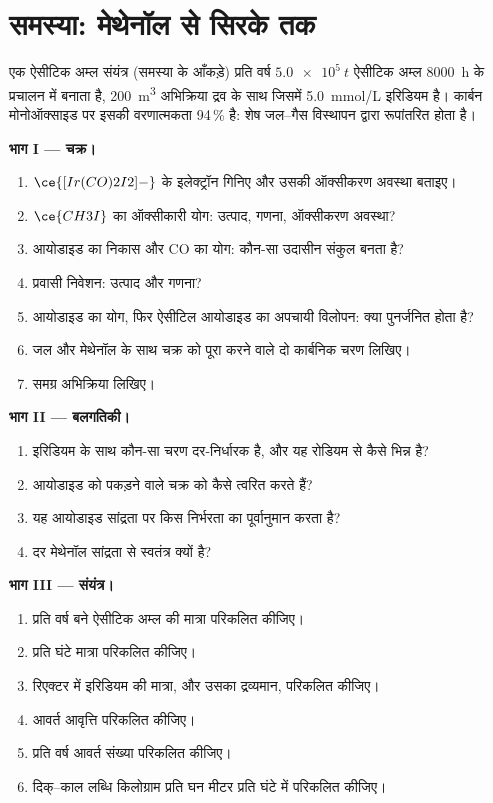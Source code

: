 \section{समस्या: मेथेनॉल से सिरके तक}

\begin{problem}
\label{pb:b3:homogeneous-catalysis:1}
एक ऐसीटिक अम्ल संयंत्र (समस्या के आँकड़े) प्रति वर्ष $\qty{5.0e5}{t}$ ऐसीटिक अम्ल
\qty{8000}{h} के प्रचालन में बनाता है, \qty{200}{m^3} अभिक्रिया द्रव के साथ जिसमें \qty{5.0}{mmol/L}
इरिडियम है। कार्बन मोनोऑक्साइड पर इसकी वरणात्मकता 94\,\% है: शेष
जल--गैस विस्थापन द्वारा रूपांतरित होता है।

\medskip\noindent\textbf{भाग I --- चक्र।}
\begin{enumerate}
  \item $\ce{[Ir(CO)2I2]-}$ के इलेक्ट्रॉन गिनिए और उसकी ऑक्सीकरण अवस्था बताइए।
  \item $\ce{CH3I}$ का ऑक्सीकारी योग: उत्पाद, गणना, ऑक्सीकरण अवस्था?
  \item आयोडाइड का निकास और CO का योग: कौन-सा उदासीन संकुल बनता है?
  \item प्रवासी निवेशन: उत्पाद और गणना?
  \item आयोडाइड का योग, फिर ऐसीटिल आयोडाइड का अपचायी विलोपन: क्या
        पुनर्जनित होता है?
  \item जल और मेथेनॉल के साथ चक्र को पूरा करने वाले दो कार्बनिक चरण लिखिए।
  \item समग्र अभिक्रिया लिखिए।
\end{enumerate}

\medskip\noindent\textbf{भाग II --- बलगतिकी।}
\begin{enumerate}[resume]
  \item इरिडियम के साथ कौन-सा चरण दर-निर्धारक है, और यह रोडियम से
        कैसे भिन्न है?
  \item आयोडाइड को पकड़ने वाले  चक्र को कैसे त्वरित करते हैं?
  \item यह आयोडाइड सांद्रता पर किस निर्भरता का पूर्वानुमान करता है?
  \item दर मेथेनॉल सांद्रता से स्वतंत्र क्यों है?
\end{enumerate}

\medskip\noindent\textbf{भाग III --- संयंत्र।}
\begin{enumerate}[resume]
  \item प्रति वर्ष बने ऐसीटिक अम्ल की मात्रा परिकलित कीजिए।
  \item प्रति घंटे मात्रा परिकलित कीजिए।
  \item रिएक्टर में इरिडियम की मात्रा, और उसका द्रव्यमान, परिकलित कीजिए।
  \item आवर्त आवृत्ति परिकलित कीजिए।
  \item प्रति वर्ष आवर्त संख्या परिकलित कीजिए।
  \item दिक्--काल लब्धि किलोग्राम प्रति घन मीटर प्रति घंटे में परिकलित कीजिए।
\end{enumerate}


\end{problem}
